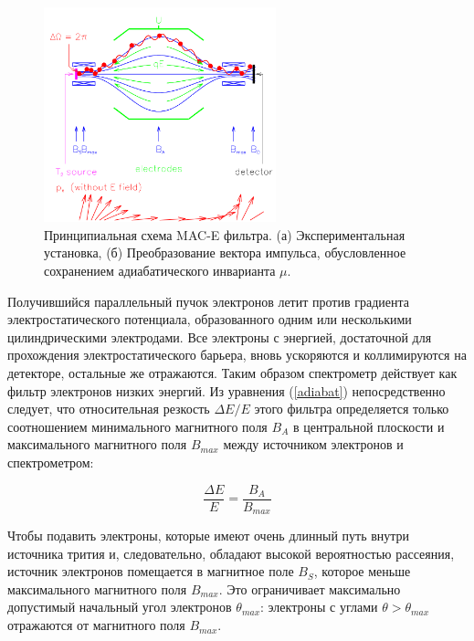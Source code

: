 \documentclass[a4paper,14pt]{extarticle}
\begin{document}
    \begin{figure}
        \center
        \includegraphics[width=0.6\textwidth]{spectrometer.png}
        \captionsetup{width=0.8\textwidth}
        \caption{Принципиальная схема MAC-E фильтра. (а) Экспериментальная установка, (б) Преобразование вектора импульса, обусловленное сохранением адиабатического инварианта $\mu$.}
        \label{fig:spectrometer}
    \end{figure}
    
    Получившийся параллельный пучок электронов летит против градиента электростатического потенциала, образованного
    одним или несколькими цилиндрическими электродами. Все электроны с энергией, достаточной для прохождения
    электростатического барьера, вновь ускоряются и коллимируются на детекторе, остальные же отражаются.
    Таким образом спектрометр действует как фильтр электронов низких энергий. Из уравнения (\ref{adiabat})
    непосредственно следует, что относительная резкость $\Delta E/E$ этого фильтра определяется только соотношением
    минимального магнитного поля $B_A$ в центральной плоскости и максимального магнитного поля
    $B_{max}$ между источником электронов и спектрометром:
    
    \begin{equation}
        \label{form2}
        \frac{\Delta E}{E} = \frac{B_A}{B_{max}}
    \end{equation}
    
    Чтобы подавить электроны, которые имеют очень длинный путь внутри источника трития
    и, следовательно, обладают высокой вероятностью рассеяния, источник электронов помещается в
    магнитное поле $B_S$, которое меньше максимального магнитного поля $B_{max}$.
    Это ограничивает максимально допустимый начальный угол электронов $\theta_{max}$:
    электроны с углами $\theta > \theta_{max}$ отражаются от магнитного поля $B_{max}$.
    
\end{document}
